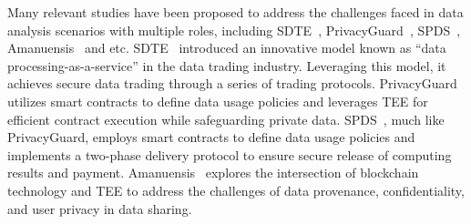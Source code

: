 Many relevant studies have been proposed to address the challenges faced in data analysis scenarios with multiple roles, including SDTE~\cite{dai2019sdte}, PrivacyGuard~\cite{xiao2020privacyguard}, SPDS~\cite{wang2020spds}, Amanuensis~\cite{hardin2022amanuensis} and etc.
SDTE~\cite{dai2019sdte} introduced an innovative model known as ``data processing-as-a-service'' in the data trading industry. Leveraging this model, it achieves secure data trading through a series of trading protocols.
PrivacyGuard~\cite{xiao2020privacyguard} utilizes smart contracts to define data usage policies and leverages TEE for efficient contract execution while safeguarding private data.
SPDS~\cite{wang2020spds}, much like PrivacyGuard, employs smart contracts to define data usage policies and implements a two-phase delivery protocol to ensure secure release of computing results and payment.
Amanuensis~\cite{hardin2022amanuensis} explores the intersection of blockchain technology and TEE to address the challenges of data provenance, confidentiality, and user privacy in data sharing.

